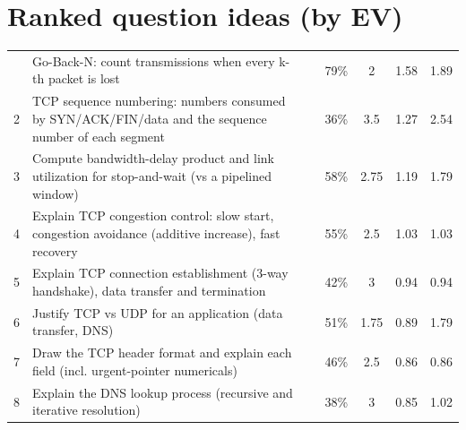 \section{Ranked question ideas (by EV)}
{\footnotesize\zebra
\begin{xltabular}{\linewidth}{r>{\raggedright\arraybackslash}Xccccc}
\toprule \thead{\#} &  &  &  &  &  & \\\midrule\endhead
\bottomrule{} & Go-Back-N: count transmissions when every k-th packet is lost &  & 79\% & 2 & 1.58 & 1.89\\
2 & TCP sequence numbering: numbers consumed by SYN/ACK/FIN/data and the sequence number of each segment &  & 36\% & 3.5 & 1.27 & 2.54\\
3 & Compute bandwidth-delay product and link utilization for stop-and-wait (vs a pipelined window) &  & 58\% & 2.75 & 1.19 & 1.79\\
4 & Explain TCP congestion control: slow start, congestion avoidance (additive increase), fast recovery &  & 55\% & 2.5 & 1.03 & 1.03\\
5 & Explain TCP connection establishment (3-way handshake), data transfer and termination &  & 42\% & 3 & 0.94 & 0.94\\
6 & Justify TCP vs UDP for an application (data transfer, DNS) &  & 51\% & 1.75 & 0.89 & 1.79\\
7 & Draw the TCP header format and explain each field (incl. urgent-pointer numericals) &  & 46\% & 2.5 & 0.86 & 0.86\\
8 & Explain the DNS lookup process (recursive and iterative resolution) &  & 38\% & 3 & 0.85 & 1.02\\

\end{xltabular}}
